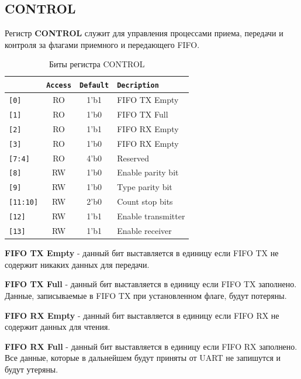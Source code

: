 \documentclass[a4paper,12pt]{article}
\begin{document}
\subsection{CONTROL}

Регистр \textbf{CONTROL} служит для управления процессами приема, передачи и контроля за флагами приемного и передающего FIFO.

\begin{table}[H]
  \begin{center}
    \begin{tabular}{l|c|c|l}
      \rowcolor[gray]{0.7}{\tt Bit} & {\tt Access} & {\tt Default} & {\tt Decription} \\\hline\hline
      {\tt [0]} & RO & 1'b1 & FIFO TX Empty \\ \hline
      {\tt [1]} & RO & 1'b0 & FIFO TX Full \\ \hline
      {\tt [2]} & RO & 1'b1 & FIFO RX Empty \\ \hline
      {\tt [3]} & RO & 1'b0 & FIFO RX Empty \\ \hline
      {\tt [7:4]} & RO & 4'b0 & Reserved \\ \hline

      {\tt [8]} & RW & 1'b0 & Enable parity bit \\ \hline
      {\tt [9]} & RW & 1'b0 & Type parity bit\\ \hline
      {\tt [11:10]} & RW & 2'b0 & Count stop bits \\ \hline

      {\tt [12]} & RW & 1'b1 & Enable transmitter \\ \hline
      {\tt [13]} & RW & 1'b1 & Enable receiver \\ \hline
    \end{tabular}
    \caption{Биты регистра CONTROL}
    \label{tbl:control_bits}
    \end{center}
\end{table}


\textbf{FIFO TX Empty} - данный бит выставляется в единицу если FIFO TX не содержит никаких данных для передачи.

\textbf{FIFO TX Full} - данный бит выставляется в единицу если FIFO TX заполнено. Данные, записываемые в FIFO TX при установленном флаге, будут потеряны.

\textbf{FIFO RX Empty} - данный бит выставляется в единицу если FIFO RX не содержит данных для чтения.

\textbf{FIFO RX Full} - данный бит выставляется в единицу если FIFO RX заполнено. Все данные, которые в дальнейшем будут приняты от UART не запишутся и будут утеряны.
\end{document}
